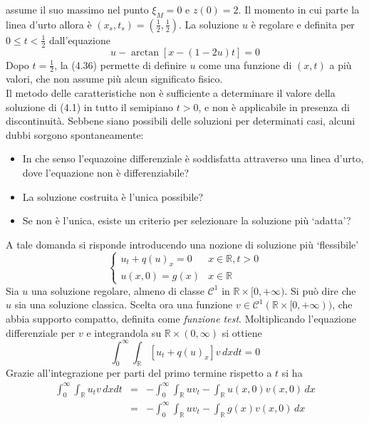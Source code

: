 \documentclass[a4paper,12pt, draft]{article}
\theoremstyle{break}
\numberwithin{equation}{section}
\begin{document}
assume il suo massimo nel punto \(\xi_M = 0\) e \(z(0) = 2\). Il momento in cui parte la linea d'urto allora è \((x_s, t_s) = (\frac{1}{2}, \frac{1}{2})\). La soluzione \(u\) è regolare e definita per \(0 \leq t < \frac{1}{2}\) dall'equazione
\begin{equation}
  u - \arctan [x-(1 - 2u)t] = 0
\end{equation} 
Dopo \(t = \frac{1}{2}\), la (4.36) permette di definire \(u\) come una funzione di \((x, t)\) a più valori, che non assume più alcun significato fisico. \\
Il metodo delle caratteristiche non è sufficiente a determinare il valore della soluzione di (4.1) in tutto il semipiano \(t > 0\), e non è applicabile in presenza di discontinuità. Sebbene siano possibili delle soluzioni per determinati casi, alcuni dubbi sorgono spontaneamente:
\begin{itemize}
  \item In che senso l'equazoine differenziale è soddisfatta attraverso una linea d'urto, dove l'equazione non è differenziabile?
  \item La soluzione costruita è l'unica possibile?
  \item Se non è l'unica, esiste un criterio per selezionare la soluzione più `adatta'?
\end{itemize}
A tale domanda si risponde introducendo una nozione di soluzione più `flessibile'
\begin{equation}
  \begin{cases}
    u_t + q(u)_x = 0 & x \in \mathbb{R}, t> 0 \\
    u(x, 0) = g(x) & x \in \mathbb{R}
  \end{cases}
\end{equation}
Sia \(u\) una soluzione regolare, almeno di classe \(\mathcal{C}^1\) in \(\mathbb{R} \times [0, +\infty)\). Si può dire che \(u\) sia una soluzione classica. Scelta ora una funzione \(v \in \mathcal{C}^1(\mathbb{R} \times [0, +\infty))\), che abbia supporto compatto, definita come \emph{funzione test}. Moltiplicando l'equazione differenziale per \(v\) e integrandola su \(\mathbb{R} \times (0, \infty)\) si ottiene
\begin{equation}
  \int_0^{\infty} \int_{\mathbb{R}} [u_t + q(u)_x]v \, dxdt = 0
\end{equation}
Grazie all'integrazione per parti del primo termine rispetto a \(t\) si ha
\begin{eqnarray*}
  \int_0^{\infty} \int_{\mathbb{R}} u_tv \, dxdt & = & -\int_0^{\infty} \int_{\mathbb{R}} uv_t -\int_{\mathbb{R}} u(x,0)v(x,0) \, dx \\
  & = & -\int_0^{\infty} \int_{\mathbb{R}} uv_t -\int_{\mathbb{R}} g(x)v(x,0) \, dx
\end{eqnarray*}
\end{document}
